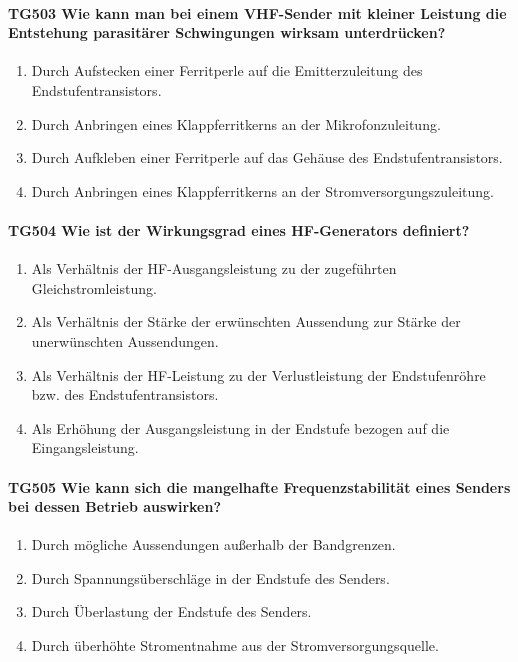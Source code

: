 \documentclass[8pt]{article}
\begin{document}
\paragraph*{TG503 Wie kann man bei einem VHF-Sender mit kleiner Leistung die Entstehung parasitärer Schwingungen wirksam unterdrücken?}
\begin{enumerate}[nolistsep,label=\Alph*]
\item Durch Aufstecken einer Ferritperle auf die Emitterzuleitung des Endstufentransistors. 
\item Durch Anbringen eines Klappferritkerns an der Mikrofonzuleitung. 
\item Durch Aufkleben einer Ferritperle auf das Gehäuse des Endstufentransistors.
\item Durch Anbringen eines Klappferritkerns an der Stromversorgungszuleitung.
\end{enumerate}

\paragraph*{TG504 Wie ist der Wirkungsgrad eines HF-Generators definiert?}
\begin{enumerate}[nolistsep,label=\Alph*]
\item Als Verhältnis der HF-Ausgangsleistung zu der zugeführten Gleichstromleistung.
\item Als Verhältnis der Stärke der erwünschten Aussendung zur Stärke der unerwünschten Aussendungen.
\item Als Verhältnis der HF-Leistung zu der Verlustleistung der Endstufenröhre bzw. des Endstufentransistors.
\item Als Erhöhung der Ausgangsleistung in der Endstufe bezogen auf die Eingangsleistung.
\end{enumerate}

\paragraph*{TG505 Wie kann sich die mangelhafte Frequenzstabilität eines Senders bei dessen Betrieb auswirken?}
\begin{enumerate}[nolistsep,label=\Alph*]
\item Durch mögliche Aussendungen außerhalb der Bandgrenzen.
\item Durch Spannungsüberschläge in der Endstufe des Senders.
\item Durch Überlastung der Endstufe des Senders. 
\item Durch überhöhte Stromentnahme aus der Stromversorgungsquelle.
\end{enumerate}
\end{document}

